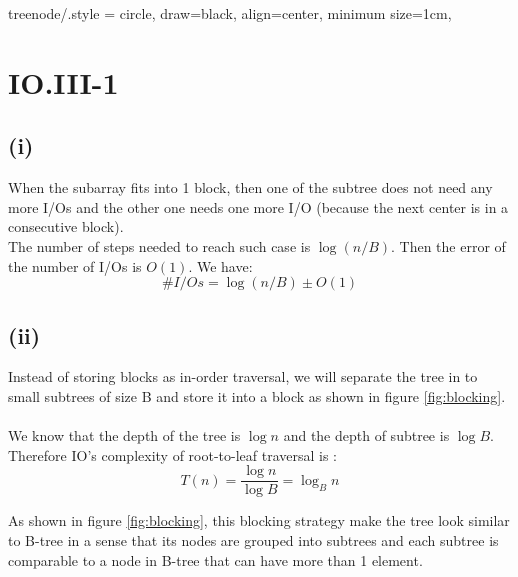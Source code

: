 
\tikzset
{
    treenode/.style = {circle, draw=black, align=center, minimum size=1cm},
}

\section*{IO.III-1}

\subsection*{(i)}
When the subarray fits into 1 block, then one of the subtree does not need any more I/Os and the other one needs one more I/O (because the next center is in a consecutive block).\\ 

The number of steps needed to reach such case is $\log(n/B)$. Then the error of the number of I/Os is $O(1)$. We have:
$$\#I/Os = \log(n/B) \pm O(1)$$

\subsection*{(ii)}
Instead of storing blocks as in-order traversal, we will separate the tree in to small subtrees of size B and store it into a block as shown in figure \ref{fig:blocking}.
\\\\
We know that the depth of the tree is $\log n$ and the depth of subtree is $\log B$. Therefore IO's complexity of root-to-leaf traversal is :
$$T(n) = \frac{\log n}{\log B} = \log_{B} n$$

As shown in figure \ref{fig:blocking}, this blocking strategy make the tree look similar to B-tree in a sense that
its nodes are grouped into subtrees and each subtree is comparable to a node in B-tree that can have more than 1 element.

